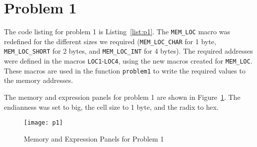 \section*{Problem 1}
The code listing for problem 1 is Listing~\ref{list:p1}. The \texttt{MEM\_LOC} macro was redefined for the different sizes we required (\texttt{MEM\_LOC\_CHAR} for 1 byte, \texttt{MEM\_LOC\_SHORT} for 2 bytes, and \texttt{MEM\_LOC\_INT} for 4 bytes). The required addresses were defined in the macros \texttt{LOC1}-\texttt{LOC4}, using the new macros created for \texttt{MEM\_LOC}. These macros are used in the function \texttt{problem1} to write the required values to the memory addresses.

The memory and expression panels for problem 1 are shown in Figure~\ref{fig:p1}. The endianness was set to big, the cell size to 1 byte, and the radix to hex.



\begin{figure}[htp]
\centering
\texttt{[image: p1]}
\caption[problem 1]{Memory and Expression Panels for Problem 1}\label{fig:p1}
\end{figure}